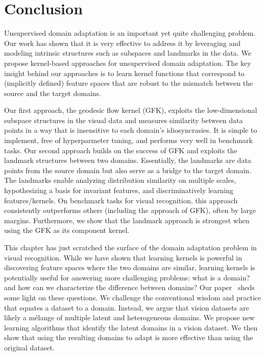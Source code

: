 \section{Conclusion} \label{sConclusion}

Unsupervised domain adaptation is an important yet quite challenging problem. Our work has shown that it is very effective to address it by leveraging and modeling intrinsic structures such as subspaces and landmarks in the data.  We propose  kernel-based approaches for unsupervised domain adaptation. 
The key insight behind our approaches is to learn kernel functions that correspond to (implicitly defined) feature spaces that are robust to the mismatch between the source and the target domains. 

Our first approach, the geodesic flow kernel (GFK), exploits the low-dimensional subspace structures in the visual data and measures similarity between data points in a way that is insensitive to each domain's idiosyncrasies.  It is simple to implement, free of hyperparmeter tuning, and performs very well in benchmark tasks. Our second approach builds on the success of GFK and exploits the landmark structures between two domains. Essentially, the landmarks are data points from the source domain but also serve as a bridge to  the target domain. The landmarks enable analyzing distribution similarity on multiple scales, hypothesizing a basis for invariant features, and discriminatively learning features/kernels. On benchmark tasks for visual recognition, this approach consistently outperforms  others (including the approach of GFK), often by large margins.  Furthermore, we show that the landmark approach is strongest when using the GFK as its component kernel.

This chapter has just scratched the surface of the domain adaptation problem in visual recognition. While we have shown that learning kernels is powerful in discovering feature spaces where the two domains are similar, learning kernels is potentially useful for answering more challenging problems: what is a domain?  and how can we characterize the difference between domains? Our paper~\cite{our2013reshape} sheds some light on these questions.  We challenge the conventional wisdom and practice that equates a dataset to a domain. Instead, we argue that vision datasets are likely a m\'{e}lange of multiple latent and heterogeneous domains. We propose new learning algorithms that identify the latent domains in a vision dataset. We then show that using the resulting domains to adapt is more effective than using the original dataset. 


